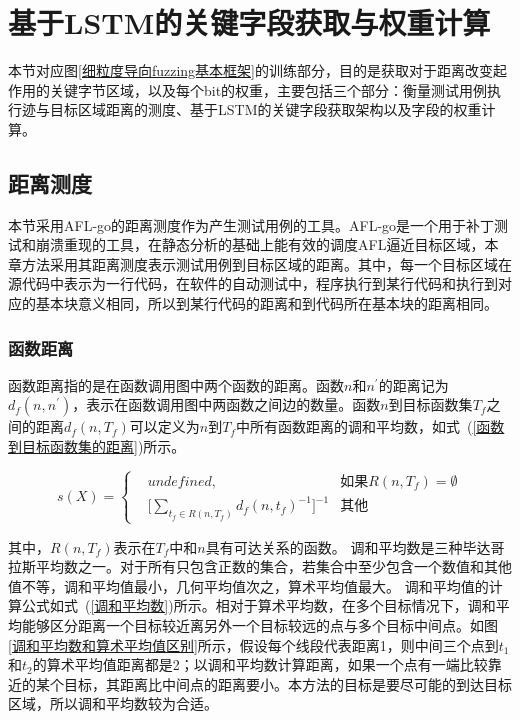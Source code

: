 \section{基于LSTM的关键字段获取与权重计算}
\label{基于LSTM的关键字段获取}

本节对应图\ref{细粒度导向fuzzing基本框架}的训练部分，目的是获取对于距离改变起作用的关键字节区域，以及每个bit的权重，主要包括三个部分：衡量测试用例执行迹与目标区域距离的测度、基于LSTM的关键字段获取架构以及字段的权重计算。

\subsection{距离测度}
\label{距离测度}

本节采用AFL-go的距离测度作为产生测试用例的工具。AFL-go是一个用于补丁测试和崩溃重现的工具，在静态分析的基础上能有效的调度AFL逼近目标区域，本章方法采用其距离测度表示测试用例到目标区域的距离。其中，每一个目标区域在源代码中表示为一行代码，在软件的自动测试中，程序执行到某行代码和执行到对应的基本块意义相同，所以到某行代码的距离和到代码所在基本块的距离相同。

\subsubsection{函数距离}

函数距离指的是在函数调用图中两个函数的距离。函数$n$和$n^{'}$的距离记为$d_{f}(n,n^{'})$，表示在函数调用图中两函数之间边的数量。函数$n$到目标函数集$T_f$之间的距离$d_f (n,T_f)$可以定义为$n$到$T_f$中所有函数距离的调和平均数，如式~(\ref{函数到目标函数集的距离})所示。

\begin{equation}\label{函数到目标函数集的距离}
s(X)=\left\{
\begin{aligned}
& undefined, & \text{如果} R(n, T_{f}) = \emptyset \\
& \lbrack \sum_{t_f \in R(n, T_{f})}d_{f}(n,t_{f})^{-1}\rbrack ^{-1} & \text{其他}
\end{aligned}
\right.
\end{equation} 

其中，$R(n,T_{f})$表示在$T_f$中和$n$具有可达关系的函数。
调和平均数是三种毕达哥拉斯平均数之一。对于所有只包含正数的集合，若集合中至少包含一个数值和其他值不等，调和平均值最小，几何平均值次之，算术平均值最大。
调和平均值的计算公式如式~(\ref{调和平均数})所示。相对于算术平均数，在多个目标情况下，调和平均能够区分距离一个目标较近离另外一个目标较远的点与多个目标中间点。如图\ref{调和平均数和算术平均值区别}所示，假设每个线段代表距离1，则中间三个点到$t_1$和$t_2$的算术平均值距离都是2；以调和平均数计算距离，如果一个点有一端比较靠近的某个目标，其距离比中间点的距离要小。本方法的目标是要尽可能的到达目标区域，所以调和平均数较为合适。

